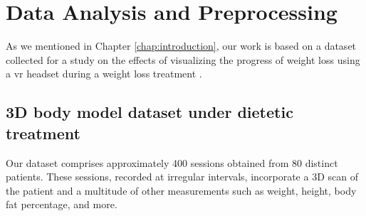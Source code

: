 \chapter{Data Analysis and Preprocessing}\label{chap:data}

As we mentioned in Chapter \ref{chap:introduction}, our work is based on a
dataset collected for a study on the effects of visualizing the progress of
weight loss using a \gls{vr} headset during a weight loss treatment .

\section{3D body model dataset under dietetic treatment}

Our dataset comprises approximately 400 sessions obtained from 80 distinct
patients. These sessions, recorded at irregular intervals, incorporate a 3D
scan of the patient and a multitude of other measurements such as weight,
height, body fat percentage, and more.

